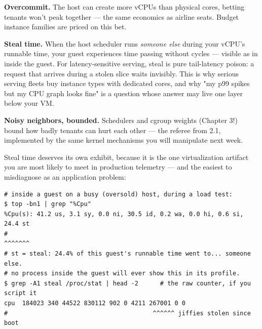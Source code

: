 \begin{tbbitemize}
  \item \textbf{Overcommit.} The host can create more vCPUs than physical cores, betting tenants won't peak together — the same economics as airline seats. Budget instance families are priced on this bet.
  \item \textbf{Steal time.} When the host scheduler runs \textit{someone else} during your vCPU's runnable time, your guest experiences time passing without cycles — visible as  in  inside the guest. For latency-sensitive serving, steal is pure tail-latency poison: a request that arrives during a stolen slice waits invisibly. This is why serious serving fleets buy instance types with dedicated cores, and why "my p99 spikes but my CPU graph looks fine" is a question whose answer may live one layer below your VM.
  \item \textbf{Noisy neighbors, bounded.} Schedulers and cgroup weights (Chapter 3!) bound how badly tenants can hurt each other — the referee from 2.1, implemented by the same kernel mechanisms you will manipulate next week.
\end{tbbitemize}

Steal time deserves its own exhibit, because it is the one virtualization artifact you are most likely to meet in production telemetry — and the easiest to misdiagnose as an application problem:

\begin{terminalbox}
\begin{Verbatim}[breaklines=true,breakanywhere=true,fontsize=\small,formatcom=\color{tbbtermfg},codes=\tbbcodeactive]
# inside a guest on a busy (oversold) host, during a load test:
$ top -bn1 | grep "%Cpu"
%Cpu(s): 41.2 us, 3.1 sy, 0.0 ni, 30.5 id, 0.2 wa, 0.0 hi, 0.6 si, 24.4 st
#                                                                  ^^^^^^^
# st = steal: 24.4% of this guest's runnable time went to... someone else.
# no process inside the guest will ever show this in its profile.
$ grep -A1 steal /proc/stat | head -2      # the raw counter, if you script it
cpu  184023 340 44522 830112 902 0 4211 267001 0 0
#                                        ^^^^^^ jiffies stolen since boot
\end{Verbatim}
\end{terminalbox}

